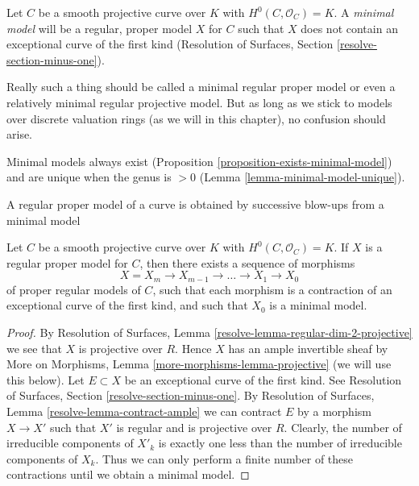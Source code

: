 \begin{definition}
\label{definition-minimal-model}
Let $C$ be a smooth projective curve over $K$ with
$H^0(C, \mathcal{O}_C) = K$. A {\it minimal model}
will be a regular, proper model $X$ for $C$ such that
$X$ does not contain an exceptional curve of the first kind
(Resolution of Surfaces, Section \ref{resolve-section-minus-one}).
\end{definition}

\noindent
Really such a thing should be called a minimal regular proper model
or even a relatively minimal regular projective model. But as long
as we stick to models over discrete valuation rings (as we will
in this chapter), no confusion should arise.

\medskip\noindent
Minimal models always exist
(Proposition \ref{proposition-exists-minimal-model}) and are unique
when the genus is $> 0$ (Lemma \ref{lemma-minimal-model-unique}).

\begin{lemma}
\label{lemma-pre-exists-minimal-model}
\begin{slogan}
A regular proper model of a curve is obtained by successive blow-ups
from a minimal model
\end{slogan}
Let $C$ be a smooth projective curve over $K$ with
$H^0(C, \mathcal{O}_C) = K$. If $X$ is a regular proper
model for $C$, then there exists a sequence of morphisms
$$
X = X_m \to X_{m - 1} \to \ldots \to X_1 \to X_0
$$
of proper regular models of $C$, such that each morphism is a
contraction of an exceptional curve of the first kind, and such
that $X_0$ is a minimal model.
\end{lemma}

\begin{proof}
By Resolution of Surfaces, Lemma \ref{resolve-lemma-regular-dim-2-projective}
we see that $X$ is projective over $R$. Hence $X$ has an ample
invertible sheaf by
More on Morphisms, Lemma \ref{more-morphisms-lemma-projective}
(we will use this below).
Let $E \subset X$ be an exceptional curve of the first kind.
See Resolution of Surfaces, Section \ref{resolve-section-minus-one}.
By Resolution of Surfaces, Lemma \ref{resolve-lemma-contract-ample}
we can contract $E$ by a morphism $X \to X'$ such that $X'$ is
regular and is projective over $R$. Clearly, the number of
irreducible components of $X'_k$ is exactly one less than the
number of irreducible components of $X_k$. Thus we can only
perform a finite number of these contractions until we
obtain a minimal model.
\end{proof}

